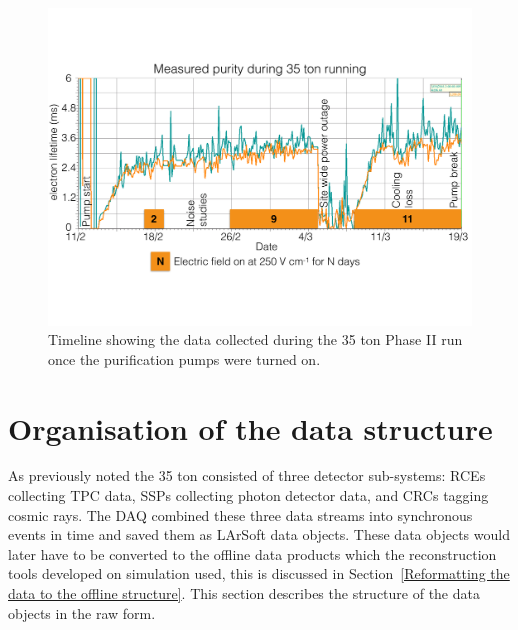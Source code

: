 \begin{figure}[h!]
  \centering
  \includegraphics[width=1.0\textwidth]{DataCollected}
  \caption[The 35 ton data sample]{Timeline showing the data collected during the 35 ton Phase II run once the purification pumps were turned on.}
  \label{fig:DataCollected}  
\end{figure}

\section{Organisation of the data structure} \label{Organisation of the data structure} %
As previously noted the 35 ton consisted of three detector sub-systems: RCEs collecting TPC data, SSPs collecting photon detector data, and CRCs tagging cosmic rays. The DAQ combined these three data streams into synchronous events in time and saved them as LArSoft data objects. These data objects would later have to be converted to the offline data products which the reconstruction tools developed on simulation used, this is discussed in Section~\ref{Reformatting the data to the offline structure}. This section describes the structure of the data objects in the raw form.\\

